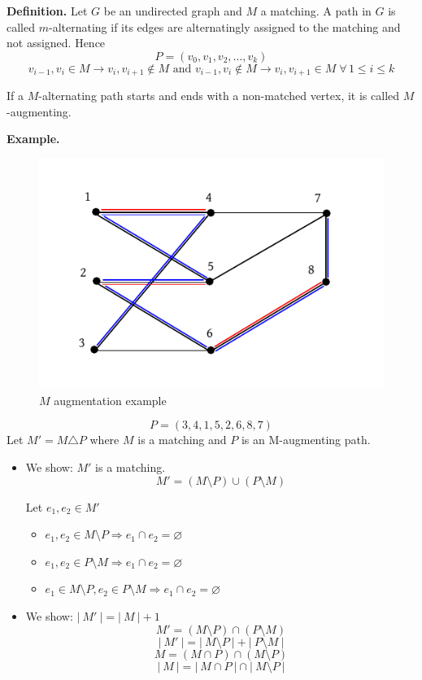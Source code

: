 \documentclass{article}
\newcommand{\card}[1]{\left|\:\!#1\:\!\right|}
\newcommand{\fall}{\;\forall\,}
\begin{document}
\textbf{Definition.}
  Let $G$ be an undirected graph and $M$ a matching. A path in $G$ is called $m$-alternating if its edges are alternatingly assigned to the matching and not assigned. Hence
  \[ P = (v_0, v_1, v_2, \ldots, v_k) \]
  \[
    v_{i-1}, v_i \in M \rightarrow v_i, v_{i+1} \notin M \text{ and }
    v_{i-1}, v_i \notin M \rightarrow v_i, v_{i+1} \in M
    \fall 1 \leq i \leq k
  \]

  If a $M$-alternating path starts and ends with a non-matched vertex, it is called $M$-augmenting.

\textbf{Example.}
  \begin{figure}[ht]
   \begin{center}
    \includegraphics{img/M_augmenting_example.pdf}
    \caption{$M$ augmentation example}
   \end{center}
  \end{figure}

  \[ P = (3, 4, 1, 5, 2, 6, 8, 7) \]
  Let $M' = M \triangle P$ where $M$ is a matching and $P$ is an M-augmenting path.

\begin{itemize}
  \item We show: $M'$ is a matching.
    \[ M' = (M \setminus P) \cup (P \setminus M) \]

    Let $e_1, e_2 \in M'$
    \begin{itemize}
      \item $e_1, e_2 \in M \setminus P \Rightarrow e_1 \cap e_2 = \diameter$
      \item $e_1, e_2 \in P \setminus M \Rightarrow e_1 \cap e_2 = \diameter$
      \item $e_1 \in M \setminus P, e_2 \in P \setminus M \Rightarrow e_1 \cap e_2 = \diameter$
    \end{itemize}

  \item We show: $\card{M'} = \card{M} + 1$
    \[ M' = (M \setminus P) \cap (P \setminus M) \]
    \[ \card{M'} = \card{M \setminus P} + \card{P \setminus M} \]
    \[ M = (M \cap P) \cap (M \setminus P) \]
    \[ \card{M} = \card{M \cap P} \cap \card{M \setminus P} \]
\end{itemize}
\end{document}
